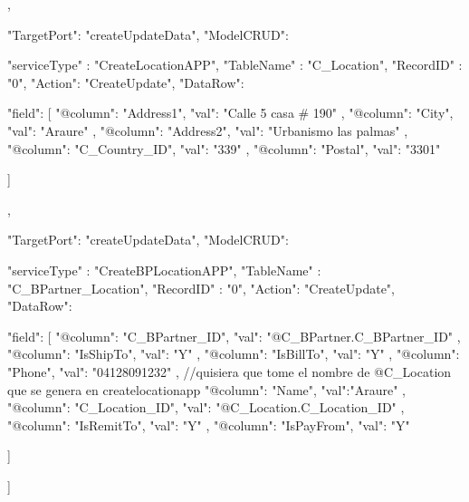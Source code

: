 {{{{                },
                {
                "TargetPort": "createUpdateData",
                "ModelCRUD": {
                "serviceType" : "CreateLocationAPP",
                "TableName" : "C_Location",
                "RecordID" : "0",
                "Action": "CreateUpdate",
                 "DataRow": {
                "field": [
                    {
                        "@column": "Address1",
                        "val": "Calle 5 casa # 190"
                    },
                    {
                        "@column": "City",
                        "val": "Araure"
                    },
                    {
                        "@column": "Address2",
                        "val": "Urbanismo las palmas"
                    },
                    {
                        "@column": "C_Country_ID",
                        "val": "339"
                    },
                    {
                        "@column": "Postal",
                        "val": "3301"
                    }
                 
                ]
                }


                }

                
                
                },
                {
                "TargetPort": "createUpdateData",
                "ModelCRUD": {
                "serviceType" : "CreateBPLocationAPP",
                "TableName" : "C_BPartner_Location",
                "RecordID" : "0",
                "Action": "CreateUpdate",
                 "DataRow": {
                "field": [
                    {
                        "@column": "C_BPartner_ID",
                        "val": "@C_BPartner.C_BPartner_ID"
                    },
                     {
                        "@column": "IsShipTo",
                        "val": "Y"
                    },
                       {
                        "@column": "IsBillTo",
                        "val": "Y"
                    },
                       {
                        "@column": "Phone",
                        "val": "04128091232"
                    },
                    {
                        //quisiera que tome el nombre de @C_Location que se genera en createlocationapp
                        "@column": "Name",
                        "val":"Araure"
                    },
                    {
                        "@column": "C_Location_ID",
                        "val": "@C_Location.C_Location_ID"
                    },
                    {
                        "@column": "IsRemitTo",
                        "val": "Y"
                    },
                    {
                        "@column": "IsPayFrom",
                        "val": "Y"
                    }
                 
                ]
                }


                }

                
                
                }

            ]
        }



    }


}
